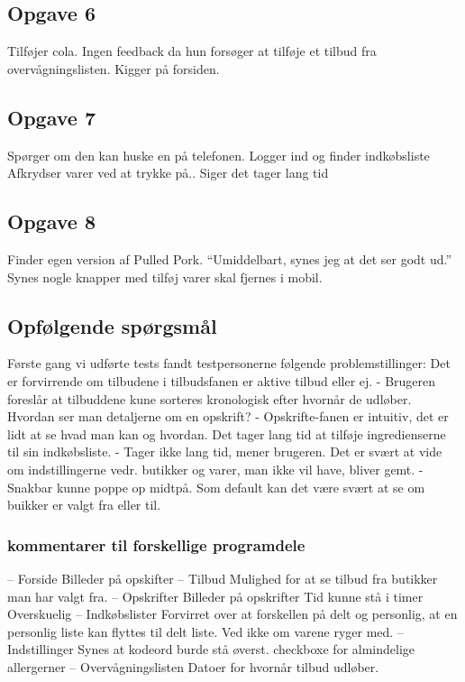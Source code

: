 \subsection{Opgave 6}
Tilføjer cola. Ingen feedback da hun forsøger  at tilføje et tilbud fra overvågningslisten. 
Kigger på forsiden.

\subsection{Opgave 7}
Spørger om den kan huske en på telefonen.
Logger ind og finder indkøbsliste
Afkrydser varer ved at trykke på.. Siger det tager lang tid

\subsection{Opgave 8}
Finder egen version af Pulled Pork.
“Umiddelbart, synes jeg at det ser godt ud.” Synes nogle knapper med tilføj varer skal fjernes i mobil.

\subsection{Opfølgende spørgsmål}
Første gang vi udførte tests fandt testpersonerne følgende problemstillinger:
Det er forvirrende om tilbudene i tilbudsfanen er aktive tilbud eller ej.
 - Brugeren foreslår at tilbuddene kune sorteres kronologisk efter hvornår de udløber.
Hvordan ser man detaljerne om en opskrift?
 - Opskrifte-fanen er intuitiv, det er lidt at se hvad man kan og hvordan.
Det tager lang tid at tilføje ingredienserne til sin indkøbsliste.
 - Tager ikke lang tid, mener brugeren.
Det er svært at vide om indstillingerne vedr. butikker og varer, man ikke vil have, bliver gemt.
 - Snakbar kunne poppe op midtpå. Som default kan det være svært at se om buikker er valgt fra eller til.
\subsubsection{kommentarer til forskellige programdele}
– Forside
	Billeder på opskifter
– Tilbud
	Mulighed for at se tilbud fra butikker man har valgt fra.
– Opskrifter
	Billeder på opskrifter
	Tid kunne stå i timer
	Overskuelig
– Indkøbslister
	Forvirret over at forskellen på delt og personlig, at en personlig liste kan flyttes til delt liste. Ved ikke om varene ryger med.
– Indstillinger
Synes at kodeord burde stå øverst.
checkboxe for almindelige allergerner
– Overvågningslisten
	Datoer for hvornår tilbud udløber.


